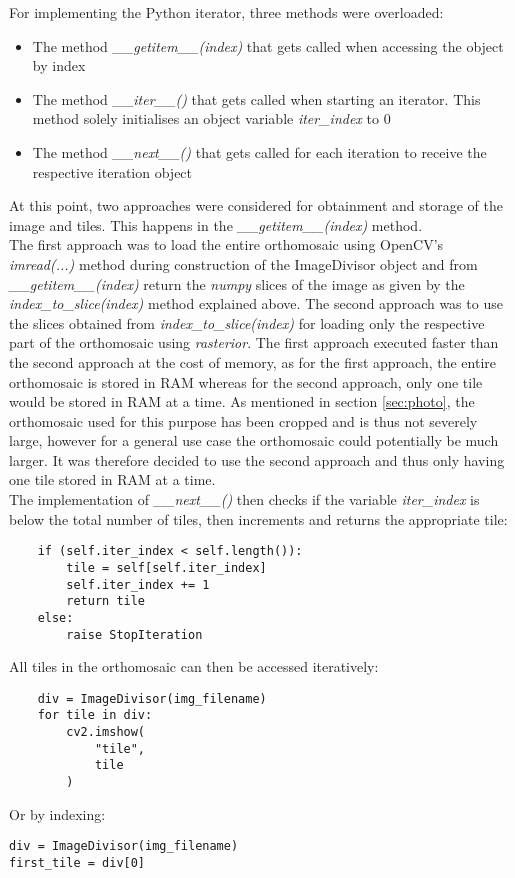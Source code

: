 \documentclass[../Head/Main.tex]{subfiles}
\begin{document}
For implementing the Python iterator, three methods were overloaded:
\begin{itemize}
\item The method \textit{\_\_getitem\_\_(index)} that gets called when accessing the object by index
\item The method \textit{\_\_iter\_\_()} that gets called when starting an iterator. This method solely initialises an object variable \textit{iter\_index} to 0
\item The method \textit{\_\_next\_\_()} that gets called for each iteration to receive the respective iteration object
\end{itemize}
At this point, two approaches were considered for obtainment and storage of the image and tiles. This happens in the \textit{\_\_getitem\_\_(index)} method.\\
The first approach was to load the entire orthomosaic using OpenCV's \textit{imread(...)} method during construction of the ImageDivisor object and from \textit{\_\_getitem\_\_(index)} return the \textit{numpy} slices of the image as given by the \textit{index\_to\_slice(index)} method explained above. The second approach was to use the slices obtained from \textit{index\_to\_slice(index)} for loading only the respective part of the orthomosaic using \textit{rasterior}. The first approach executed faster than the second approach at the cost of memory, as for the first approach, the entire orthomosaic is stored in RAM whereas for the second approach, only one tile would be stored in RAM at a time. As mentioned in section \ref{sec:photo}, the orthomosaic used for this purpose has been cropped and is thus not severely large, however for a general use case the orthomosaic could potentially be much larger. It was therefore decided to use the second approach and thus only having one tile stored in RAM at a time.\\
The implementation of \textit{\_\_next\_\_()} then checks if the variable \textit{iter\_index} is below the total number of tiles, then increments and returns the appropriate tile:
\begin{verbatim}
    if (self.iter_index < self.length()):
        tile = self[self.iter_index]
        self.iter_index += 1
        return tile
    else:
        raise StopIteration
\end{verbatim}
All tiles in the orthomosaic can then be accessed iteratively:
\begin{verbatim}
    div = ImageDivisor(img_filename)
    for tile in div:
        cv2.imshow(
            "tile",
            tile
        )
\end{verbatim}
Or by indexing:
\begin{verbatim}
div = ImageDivisor(img_filename)
first_tile = div[0]
\end{verbatim}
\end{document}
